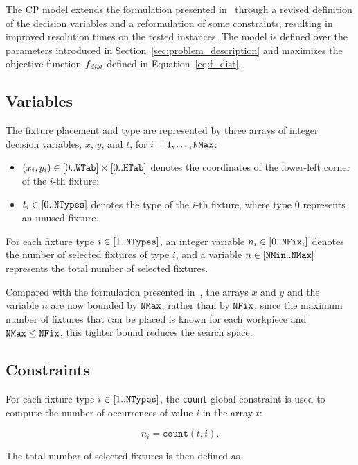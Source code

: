 \label{sec:cp_model}

The CP model extends the formulation presented in~\cite{vitali2026constraint} through a revised definition of the decision variables and a reformulation of some constraints, resulting in improved resolution times on the tested instances. The model is defined over the parameters introduced in Section~\ref{sec:problem_description} and maximizes the objective function $f_\mathit{dist}$ defined in Equation~\ref{eq:f_dist}.

\subsection{Variables}
\label{sec:cp_vars}

The fixture placement and type are represented by three arrays of integer decision variables, $x$, $y$, and $t$, for $i = 1,\ldots,\mathtt{NMax}$:
\begin{itemize}
	\item \( (x_i,y_i) \in [0..\mathtt{WTab}]\times [0..\mathtt{HTab}] \) denotes the coordinates of the lower-left corner of the $i$-th fixture;
	\item \( t_i \in [0..\mathtt{NTypes}] \) denotes the type of the $i$-th fixture, where type $0$ represents an unused fixture.
\end{itemize}

For each fixture type \(i \in [1..\mathtt{NTypes}]\), an integer variable \(n_i \in [0..\mathtt{NFix}_i]\) denotes the number of selected fixtures of type \(i\), and a variable \(n \in [\mathtt{NMin}..\mathtt{NMax}]\) represents the total number of selected fixtures.

Compared with the formulation presented in~\cite{vitali2026constraint}, the arrays \(x\) and \(y\) and the variable \(n\) are now bounded by \(\mathtt{NMax}\), rather than by \(\mathtt{NFix}\), since the maximum number of fixtures that can be placed is known for each workpiece and $\mathtt{NMax} \leq \mathtt{NFix}$, this tighter bound reduces the search space.

\subsection{Constraints}
\label{sec:cp_cons}

For each fixture type \(i \in [1..\mathtt{NTypes}]\), the \texttt{count} global constraint is used to compute the number of occurrences of value \(i\) in the array \(t\):

\[
n_i = \texttt{count}(t,i).
\]

The total number of selected fixtures is then defined as

